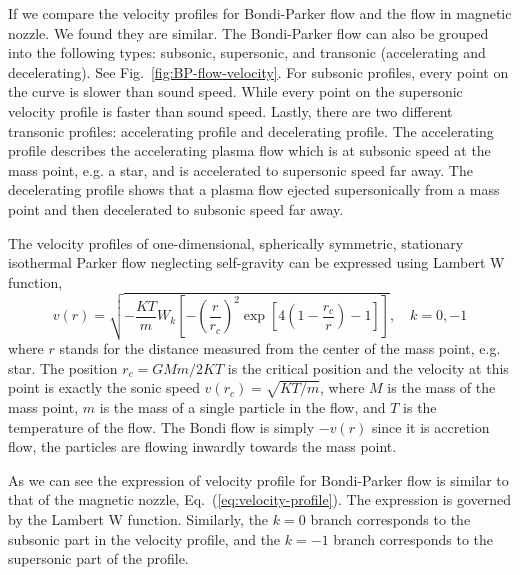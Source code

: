 If we compare the velocity profiles for Bondi-Parker flow and the flow in magnetic nozzle. We found they are similar. The Bondi-Parker flow can also be grouped into the following types: subsonic, supersonic, and transonic (accelerating and decelerating). See Fig.~\ref{fig:BP-flow-velocity}. For subsonic profiles, every point on the curve is slower than sound speed. While every point on the supersonic velocity profile is faster than sound speed. Lastly, there are two different transonic profiles: accelerating profile and decelerating profile. The accelerating profile describes the accelerating plasma flow which is at subsonic speed at the mass point, e.g. a star, and is accelerated to supersonic speed far away. The decelerating profile shows that a plasma flow ejected supersonically from a mass point and then decelerated to subsonic speed far away.

The velocity profiles of one-dimensional, spherically symmetric, stationary isothermal Parker flow neglecting self-gravity can be expressed using Lambert W function,
\begin{equation}
	v(r) = \sqrt{-\frac{KT}{m}W_k\left[ -\left(\frac{r}{r_c}\right)^2 \exp\left[4\left(1-\frac{r_c}{r}\right)-1\right] \right]}, \quad
	k = 0,-1
\end{equation}
where $r$ stands for the distance measured from the center of the mass point, e.g. star. The position $r_c=GMm/2KT$ is the critical position and the velocity at this point is exactly the sonic speed $v(r_c)=\sqrt{KT/m}$, where $M$ is the mass of the mass point, $m$ is the mass of a single particle in the flow, and $T$ is the temperature of the flow. The Bondi flow is simply $-v(r)$ since it is accretion flow, the particles are flowing inwardly towards the mass point.

As we can see the expression of velocity profile for Bondi-Parker flow is similar to that of the magnetic nozzle, Eq.~(\ref{eq:velocity-profile}). The expression is governed by the Lambert W function. Similarly, the $k=0$ branch corresponds to the subsonic part in the velocity profile, and the $k=-1$ branch corresponds to the supersonic part of the profile.

